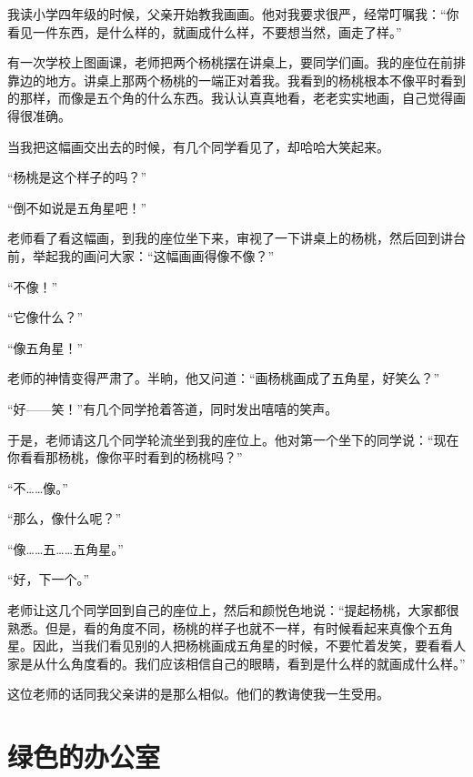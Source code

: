 \documentclass[12pt,UTF-8,openany]{ctexbook}
\begin{document}
\begin{large}
    
    我读小学四年级的时候，父亲开始教我画画。他对我要求很严，经常叮嘱我：“你看见一件东西，是什么样的，就画成什么样，不要想当然，画走了样。”
    
    有一次学校上图画课，老师把两个杨桃摆在讲桌上，要同学们画。我的座位在前排靠边的地方。讲桌上那两个杨桃的一端正对着我。我看到的杨桃根本不像平时看到的那样，而像是五个角的什么东西。我认认真真地看，老老实实地画，自己觉得画得很准确。
    
    当我把这幅画交出去的时候，有几个同学看见了，却哈哈大笑起来。
    
    “杨桃是这个样子的吗？”
    
    “倒不如说是五角星吧！”
    
    老师看了看这幅画，到我的座位坐下来，审视了一下讲桌上的杨桃，然后回到讲台前，举起我的画问大家：“这幅画画得像不像？”
    
    “不像！”
    
    “它像什么？”
    
    “像五角星！”
    
    老师的神情变得严肃了。半晌，他又问道：“画杨桃画成了五角星，好笑么？”
    
    “好——笑！”有几个同学抢着答道，同时发出嘻嘻的笑声。
    
    于是，老师请这几个同学轮流坐到我的座位上。他对第一个坐下的同学说：“现在你看看那杨桃，像你平时看到的杨桃吗？”
    
    “不……像。”
    
    “那么，像什么呢？”
    
    “像……五……五角星。”
    
    “好，下一个。”
    
    老师让这几个同学回到自己的座位上，然后和颜悦色地说：“提起杨桃，大家都很熟悉。但是，看的角度不同，杨桃的样子也就不一样，有时候看起来真像个五角星。因此，当我们看见别的人把杨桃画成五角星的时候，不要忙着发笑，要看看人家是从什么角度看的。我们应该相信自己的眼睛，看到是什么样的就画成什么样。”
    
    这位老师的话同我父亲讲的是那么相似。他们的教诲使我一生受用。
    
\end{large}



\chapter{绿色的办公室}
\end{document}
